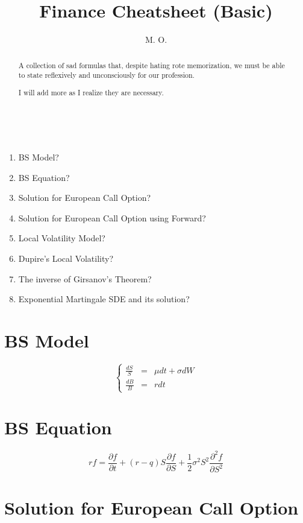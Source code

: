 \documentclass[uplatex]{jsarticle}
\title{
Finance Cheatsheet (Basic)
}
\author{
M. O.
}
\begin{document}
\maketitle

\begin{abstract}
	A collection of sad formulas that, despite hating rote memorization, we must be able to state reflexively and unconsciously for our profession.

	I will add more as I realize they are necessary.
\end{abstract}

\ \\

\begin{enumerate}
	\item BS Model?
	\item BS Equation?
	\item Solution for European Call Option?
	\item Solution for European Call Option using Forward?
	\item Local Volatility Model?
	\item Dupire's Local Volatility?
	\item The inverse of Girsanov's Theorem?
	\item Exponential Martingale SDE and its solution?
\end{enumerate}

\newpage



\section{BS Model}

\[
	\left\{
	\begin{array}{rcl}
		\displaystyle \frac{dS}{S} & = & \mu dt + \sigma dW \\
		\displaystyle \frac{dB}{B} & = & r dt
	\end{array}
	\right.
\]

\section{BS Equation}

\[
	rf
	=
	\frac{\partial f}{\partial t}
	+
	(r-q) S \frac{\partial f}{\partial S}
	+
	\frac{1}{2} \sigma^{2} S^{2}
	\frac{\partial^{2} f}{\partial S^{2}}
\]


\section{Solution for European Call Option}
\end{document}

